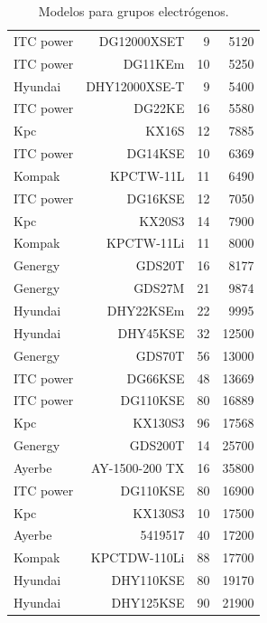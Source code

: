 \begin{table}[htbp]
\begin{tabular}{lrrr}
		ITC power     & DG12000XSET    & 9                    & 5120           \\
		ITC power     & DG11KEm        & 10                   & 5250           \\
		Hyundai       & DHY12000XSE-T  & 9                    & 5400           \\
		ITC power     & DG22KE         & 16                   & 5580           \\
		Kpc           & KX16S          & 12                   & 7885           \\
		ITC power     & DG14KSE        & 10                   & 6369           \\
		Kompak        & KPCTW-11L      & 11                   & 6490           \\
		ITC power     & DG16KSE        & 12                   & 7050           \\
		Kpc           & KX20S3         & 14                   & 7900           \\
		Kompak        & KPCTW-11Li     & 11                   & 8000           \\
		Genergy       & GDS20T         & 16                   & 8177           \\
		Genergy       & GDS27M         & 21                   & 9874           \\
		Hyundai       & DHY22KSEm      & 22                   & 9995           \\
		Hyundai       & DHY45KSE       & 32                   & 12500          \\
		Genergy       & GDS70T         & 56                   & 13000          \\
		ITC power     & DG66KSE        & 48                   & 13669          \\
		ITC power     & DG110KSE       & 80                   & 16889          \\
		Kpc           & KX130S3        & 96                   & 17568          \\
		Genergy       & GDS200T        & 14                   & 25700          \\
		Ayerbe        & AY-1500-200 TX & 16                   & 35800          \\
		ITC power     & DG110KSE       & 80                   & 16900          \\
		Kpc           & KX130S3        & 10                   & 17500          \\
		Ayerbe        & 5419517        & 40                   & 17200          \\
		Kompak        & KPCTDW-110Li   & 88                   & 17700          \\
		Hyundai       & DHY110KSE      & 80                   & 19170          \\
		Hyundai       & DHY125KSE      & 90                   & 21900          \\
		\bottomrule
	\end{tabular}
	\caption{Modelos para grupos electrógenos.}
	\label{tab:generator_data}
\end{table}


